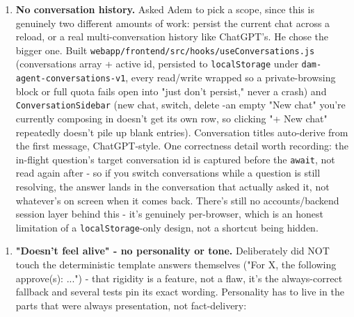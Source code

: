 \begin{enumerate}
\item \textbf{No conversation history.} Asked Adem to pick a scope, since this is genuinely two different amounts of work: persist the current chat across a reload, or a real multi-conversation history like ChatGPT's. He chose the bigger one. Built \texttt{webapp/\allowbreak{}frontend/\allowbreak{}src/\allowbreak{}hooks/\allowbreak{}useConversations.js} (conversations array + active id, persisted to \texttt{localStorage} under \texttt{dam-agent-conversations-v1}, every read/write wrapped so a private-browsing block or full quota fails open into "just don't persist," never a crash) and \texttt{ConversationSidebar} (new chat, switch, delete -an empty "New chat" you're currently composing in doesn't get its own row, so clicking "+ New chat" repeatedly doesn't pile up blank entries). Conversation titles auto-derive from the first message, ChatGPT-style. One correctness detail worth recording: the in-flight question's target conversation id is captured before the \texttt{await}, not read again after - so if you switch conversations while a question is still resolving, the answer lands in the conversation that actually asked it, not whatever's on screen when it comes back. There's still no accounts/backend session layer behind this - it's genuinely per-browser, which is an honest limitation of a \texttt{localStorage}-only design, not a shortcut being hidden.
\end{enumerate}
\begin{enumerate}
\item \textbf{"Doesn't feel alive" - no personality or tone.} Deliberately did NOT touch the deterministic template answers themselves ("For X, the following approve(s): ...") - that rigidity is a feature, not a flaw, it's the always-correct fallback and several tests pin its exact wording. Personality has to live in the parts that were always presentation, not fact-delivery:
\end{enumerate}

